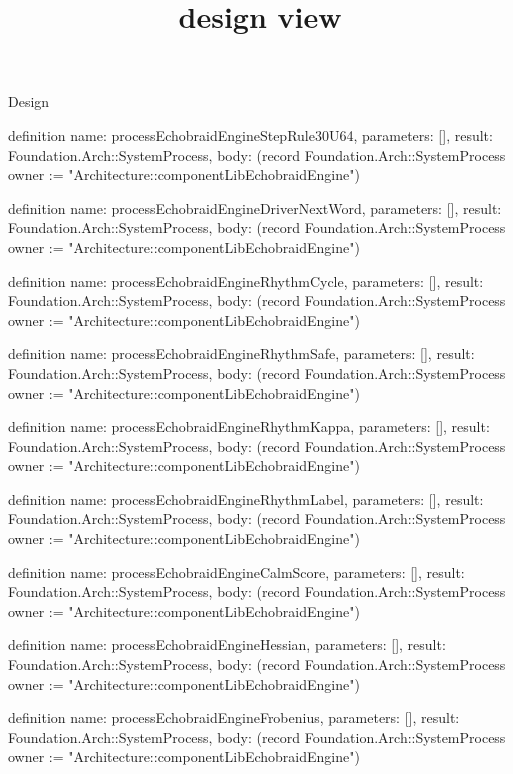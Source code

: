 \begin{lexlean}{Design}
\title{design view}
\begin{semanticmodule}
definition{
  name: processEchobraidEngineStepRule30U64,
  parameters: [],
  result: Foundation.Arch::SystemProcess,
  body: (record Foundation.Arch::SystemProcess {owner := "Architecture::componentLibEchobraidEngine"})
}

definition{
  name: processEchobraidEngineDriverNextWord,
  parameters: [],
  result: Foundation.Arch::SystemProcess,
  body: (record Foundation.Arch::SystemProcess {owner := "Architecture::componentLibEchobraidEngine"})
}

definition{
  name: processEchobraidEngineRhythmCycle,
  parameters: [],
  result: Foundation.Arch::SystemProcess,
  body: (record Foundation.Arch::SystemProcess {owner := "Architecture::componentLibEchobraidEngine"})
}

definition{
  name: processEchobraidEngineRhythmSafe,
  parameters: [],
  result: Foundation.Arch::SystemProcess,
  body: (record Foundation.Arch::SystemProcess {owner := "Architecture::componentLibEchobraidEngine"})
}

definition{
  name: processEchobraidEngineRhythmKappa,
  parameters: [],
  result: Foundation.Arch::SystemProcess,
  body: (record Foundation.Arch::SystemProcess {owner := "Architecture::componentLibEchobraidEngine"})
}

definition{
  name: processEchobraidEngineRhythmLabel,
  parameters: [],
  result: Foundation.Arch::SystemProcess,
  body: (record Foundation.Arch::SystemProcess {owner := "Architecture::componentLibEchobraidEngine"})
}

definition{
  name: processEchobraidEngineCalmScore,
  parameters: [],
  result: Foundation.Arch::SystemProcess,
  body: (record Foundation.Arch::SystemProcess {owner := "Architecture::componentLibEchobraidEngine"})
}

definition{
  name: processEchobraidEngineHessian,
  parameters: [],
  result: Foundation.Arch::SystemProcess,
  body: (record Foundation.Arch::SystemProcess {owner := "Architecture::componentLibEchobraidEngine"})
}

definition{
  name: processEchobraidEngineFrobenius,
  parameters: [],
  result: Foundation.Arch::SystemProcess,
  body: (record Foundation.Arch::SystemProcess {owner := "Architecture::componentLibEchobraidEngine"})
}


\end{semanticmodule}
\end{lexlean}
